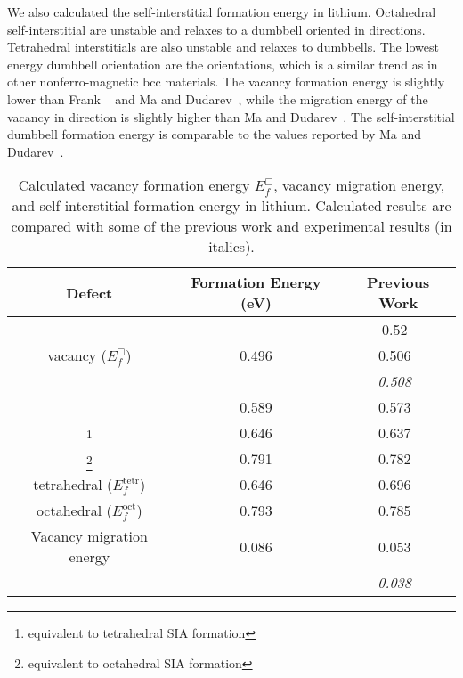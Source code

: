 We also calculated the self-interstitial formation energy in lithium. Octahedral self-interstitial are unstable and relaxes to a dumbbell oriented in  directions. Tetrahedral interstitials are also unstable and relaxes to  dumbbells. The lowest energy dumbbell orientation are the  orientations, which is a similar trend as in other nonferro-magnetic bcc materials. The vacancy formation energy is slightly lower than Frank \etal~\cite{frank1996first} and Ma and Dudarev~\cite{ma2019effect}, while the migration energy of the vacancy in  direction is slightly higher than Ma and Dudarev~\cite{ma2019effect}. The self-interstitial dumbbell formation energy is comparable to the values reported by Ma and Dudarev~\cite{ma2019}.

\begin{table}
\caption[Calculated vacancy formation energy $E_f^{\Box}$, vacancy migration energy, and self-interstitial formation energy in lithium]{Calculated vacancy formation energy $E_f^{\Box}$, vacancy migration energy, and self-interstitial formation energy in lithium. Calculated results are compared with some of the previous work and experimental results (in italics).}
\label{tab:lidmble}
\centering
\begin{minipage}{28.5em}
\let\footnoterule\relax
\begin{tabular}{c c c} \toprule
Defect					& Formation Energy (eV)						& Previous Work \\ \midrule
						&											& 0.52~\cite{frank1996first} \\ 
vacancy ($E_f^{\Box}$)	& 0.496										& 0.506~\cite{ma2019effect} \\
						&										& \textit{0.508}~\cite{LandoltBornstein1991} \\ \hline
{}			   & 0.589										&  0.573~\cite{ma2019}	 \\ \hline
{}\footnote{equivalent to tetrahedral SIA formation}   & 0.646 & 0.637~\cite{ma2019}	 \\ \hline
{}\footnote{equivalent to octahedral SIA formation}   & 0.791 &  0.782~\cite{ma2019}    \\ \hline
tetrahedral ($E_f^{\text{tetr}}$) &	0.646 &	0.696~\cite{ma2019}	\\ \hline
octahedral ($E_f^{\text{oct}}$) & 0.793	& 0.785~\cite{ma2019}	\\ \hline
Vacancy migration energy       & 0.086 & 0.053~\cite{ma2019effect}	\\ 
							   &       & \textit{0.038}~\cite{LandoltBornstein1991} \\ 
\bottomrule
\end{tabular}
\end{minipage}
\end{table}


